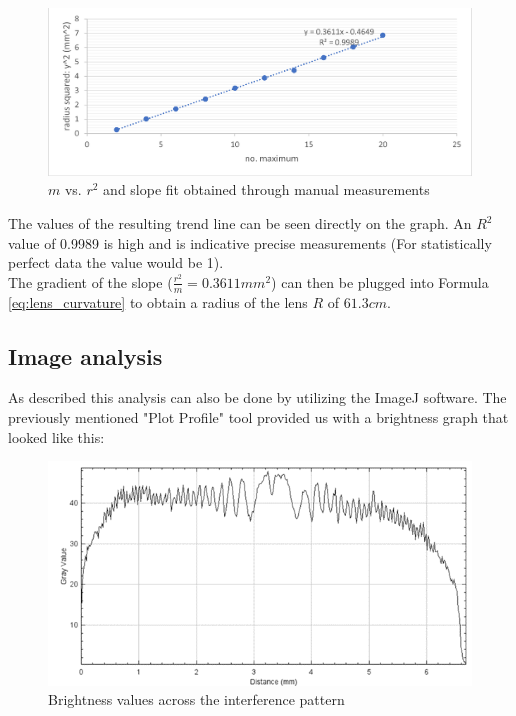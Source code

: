 \documentclass[12pt]{article}
\begin{document}
\begin{figure}[H]
  \centering
  \includegraphics[width=16cm]{./images/results_manual.png}
  \caption{$m$ vs. $r^2$ and slope fit obtained through manual measurements}
  \label{fig:result_manual}
\end{figure}

The values of the resulting trend line can be seen directly on the graph. An $R^2$  value of 0.9989
is high and is indicative precise measurements (For statistically perfect data  the value would be 1).\\

The gradient of the slope ($\frac{r^2}{m} = 0.3611mm^2$) can then be plugged into Formula \ref{eq:lens_curvature} to
obtain a radius of the lens $R$ of $61.3cm$.

\subsection{Image analysis}

As described this analysis can also be done by utilizing the ImageJ software. The previously
mentioned "Plot Profile" tool provided us with a brightness graph that looked like this:

\begin{figure}[H]
  \centering
  \includegraphics[width=14cm]{./images/profile.png}
  \caption{Brightness values across the interference pattern}
  \label{fig:profile}
\end{figure}
\end{document}
